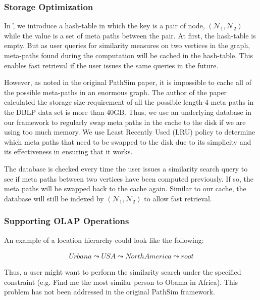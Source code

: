 
\subsubsection{Storage Optimization}

In \h, we introduce a hash-table in which the key is a pair of node,
$(\mathcal{N}_1, \mathcal{N}_2)$ while the value is a set of meta paths between
the pair.  At first, the hash-table is empty. But as user queries for
similarity measures on two vertices in the graph, meta-paths found during the
computation will be cached in the hash-table. This enables fast retrieval if
the user issues the same queries in the future.

However, as noted in the original PathSim paper, it is impossible to cache all
of the possible meta-paths in an enormous graph. The author of the paper
calculated the storage size requirement of all the possible length-4 meta paths
in the DBLP data set is more than 40GB. Thus, we use an underlying database in
our framework to regularly swap meta paths in the cache to the disk if we are
using too much memory. We use Least Recently Used (LRU) policy to determine
which meta paths that need to be swapped to the disk due to its simplicity and
its effectiveness in ensuring that it works.

The database is checked every time the user issues a similarity search query to
see if meta paths between two vertices have been computed previously. If so, the
meta paths will be swapped back to the cache again. Similar to our cache, the
database will still be indexed by $(\mathcal{N}_1, \mathcal{N}_2)$ to allow
fast retrieval.

\subsubsection{Supporting OLAP Operations}
\label{sec:hier_forest}


 An example of a location hierarchy could look like
the following:

\begin{align*}
Urbana \leadsto USA \leadsto North America \leadsto root
\end{align*}

Thus, a user might want to perform the similarity search under the specified
constraint (e.g. Find me the most similar person to Obama in Africa). This
problem has not been addressed in the original PathSim framework.

